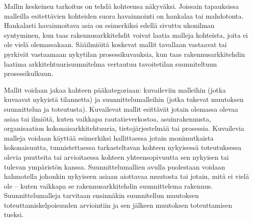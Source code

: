 \documentclass[
  finnish,
  letterpaper,
  DIV=11,
  numbers=noendperiod,
  oneside]{scrreprt}
\begin{document}
Mallin keskeinen tarkoitus on tehdä kohteensa näkyväksi. Joissain
tapauksissa malleilla esitettävien kohteiden suora havainnointi on
hankalaa tai mahdotonta. Hankalasti havainnoitava asia on esimerkiksi
edellä sivuttu ukonilman syntyminen, kun taas rakennusarkkitehdit voivat
laatia malleja kohteista, joita ei ole vielä olemassakaan. Sääilmiöitä
koskevat mallit tavallaan vastaavat tai pyrkivät vastaamaan nykytilan
prosessikuvauksia, kun taas rakennusarkkitehdin laatima
arkkitehtuurisuunnitelma vertautuu tavoitetilan suunniteltuun
prosessikulkuun.

Mallit voidaan jakaa kahteen pääkategoriaan: kuvaileviin malleihin
(jotka kuvaavat nykyistä tilannetta) ja suunnittelumalleihin (jotka
tukevat muutoksen suunnittelua ja toteutusta). Kuvailevat mallit esittävät jotain
olemassa olevaa asiaa tai ilmiötä, kuten vaikkapa rautatieverkostoa,
asuinrakennusta, organisaation kokonaisarkkitehtuuria, tietojärjestelmää
tai prosessia. Kuvailevia malleja voidaan käyttää esimerkiksi
hallittaessa jotain monimutkaista kokonaisuutta, tunnistettaessa
tarkasteltavan kohteen nykyisessä toteutuksessa olevia puutteita tai
arvioitaessa kohteen yhteensopivuutta sen nykyisen tai tulevan
ympäristön kanssa. Suunnittelumallien avulla puolestaan voidaan
hahmotella johonkin nykyiseen asiaan aiottavaa muutosta tai jotain, mitä
ei vielä ole -- kuten vaikkapa se rakennusarkkitehdin suunnittelema
rakennus. Suunnittelumalleja tarvitaan ensinnäkin suunnitellun muutoksen
toteuttamiskelpoisuuden arviointiin ja sen jälkeen muutoksen
toteuttamisen tueksi.
\end{document}
